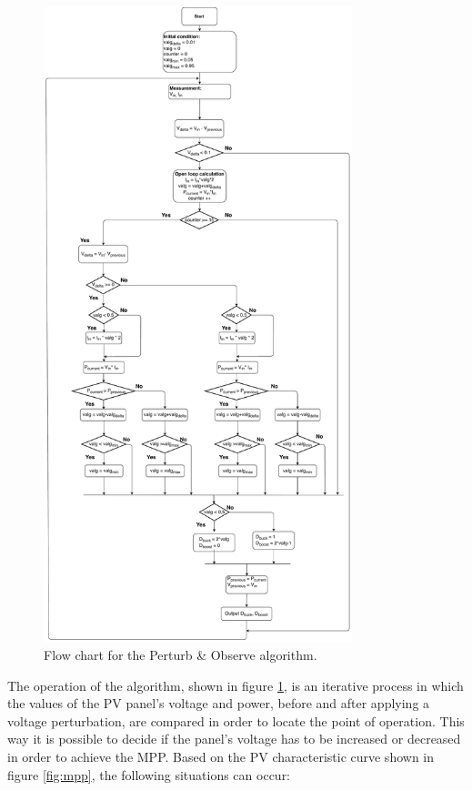 \begin{figure}[H]
	\begin{center}
		\includegraphics[width=0.8\textwidth]{../Pictures/P1/Flow_chart/2018_11_29_Flow_chart_MPPT_Buck_Bosst_converter.pdf}
		\caption{Flow chart for the Perturb \& Observe algorithm.}
		\label{fcfinal} 
	\end{center}	
\end{figure}


The operation of the algorithm, shown in figure \ref{fcfinal}, is an iterative process in which the values of the PV panel's voltage and power, before and after applying a voltage perturbation, are compared  in order to locate the point of operation. This way it is possible to decide if the panel's voltage has to be increased or decreased in order to achieve the MPP. Based on the PV characteristic curve shown in figure \ref{fig:mpp}, the following situations can occur:

